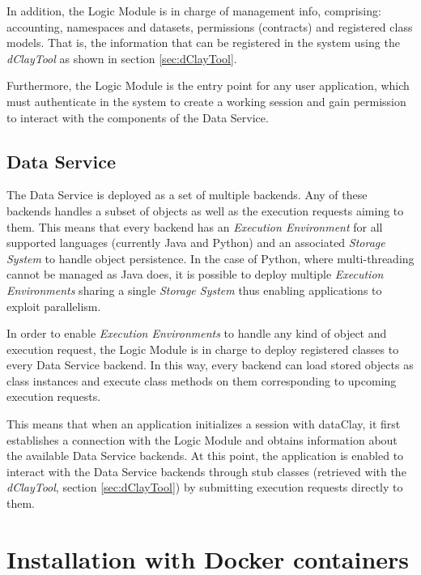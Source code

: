 In addition, the Logic Module is in charge of management info, comprising: accounting, namespaces and datasets, permissions (contracts) and registered class models. That is, the information that can be registered in the system using the \textit{dClayTool} as shown in section \ref{sec:dClayTool}.

Furthermore, the Logic Module is the entry point for any user application, which must authenticate in the system to create a working session and gain permission to interact with the components of the Data Service.

\subsection{Data Service}
\label{sec:DataService}
The Data Service is deployed as a set of multiple backends. Any of these backends handles a subset of objects as well as the execution requests aiming to them. This means that every backend has an \textit{Execution Environment} for all supported languages (currently Java and Python) and an associated \textit{Storage System} to handle object persistence. In the case of Python, where multi-threading cannot be managed as Java does, it is possible to deploy multiple \textit{Execution Environments} sharing a single \textit{Storage System} thus enabling applications to exploit parallelism.

In order to enable \textit{Execution Environments} to handle any kind of object and execution request, the Logic Module is in charge to deploy registered classes to every Data Service backend. In this way, every backend can load stored objects as class instances and execute class methods on them corresponding to upcoming execution requests.

This means that when an application initializes a session with dataClay, it first establishes a connection with the Logic Module and obtains information about the available Data Service backends. At this point, the application is enabled to interact with the Data Service backends through stub classes (retrieved with the \textit{dClayTool}, section \ref{sec:dClayTool}) by submitting execution requests directly to them.



\section{Installation with Docker  containers}

